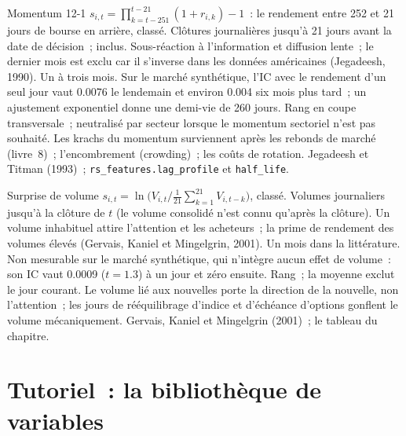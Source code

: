 \begin{predictorcard}{Momentum 12-1}\label{pred:rs:price-and-volume-features:momentum}
 $s_{i,t} = \prod_{k=t-251}^{t-21}(1 + r_{i,k}) - 1$~: le rendement entre 252 et 21 jours de bourse en arrière, classé.
 Clôtures journalières jusqu'à 21 jours avant la date de décision~;  inclus.
 Sous-réaction à l'information et diffusion lente~; le dernier mois est exclu car il s'inverse dans les données américaines
(Jegadeesh, 1990).
 Un à trois mois. Sur le marché synthétique, l'IC avec le rendement d'un seul jour vaut 0.0076 le lendemain et
environ 0.004 six mois plus tard~; un ajustement exponentiel donne une demi-vie de 260 jours.
 Rang en coupe transversale~; neutralisé par secteur lorsque le momentum sectoriel n'est pas souhaité.
 Les krachs du momentum surviennent après les rebonds de marché (livre~8)~; l'encombrement (crowding)~; les coûts de rotation.
 Jegadeesh et Titman (1993)~; \texttt{rs\_features.lag\_profile} et \texttt{half\_life}.
\end{predictorcard}

\begin{predictorcard}{Surprise de volume}\label{pred:rs:price-and-volume-features:volume}
 $s_{i,t} = \ln\bigl(V_{i,t}/\tfrac1{21}\sum_{k=1}^{21}V_{i,t-k}\bigr)$, classé.
 Volumes journaliers jusqu'à la clôture de $t$ (le volume consolidé n'est connu qu'après la clôture).
 Un volume inhabituel attire l'attention et les acheteurs~; la prime de rendement des volumes élevés (Gervais, Kaniel et Mingelgrin, 2001).
 Un mois dans la littérature. Non mesurable sur le marché synthétique, qui n'intègre aucun effet de volume~: son IC
vaut 0.0009 ($t = 1.3$) à un jour et zéro ensuite.
 Rang~; la moyenne exclut le jour courant.
 Le volume lié aux nouvelles porte la direction de la nouvelle, non l'attention~; les jours de rééquilibrage d'indice et d'échéance d'options gonflent le volume
mécaniquement.
 Gervais, Kaniel et Mingelgrin (2001)~; le tableau du chapitre.
\end{predictorcard}

\section{Tutoriel~: la bibliothèque de variables}\label{tut:rs:price-and-volume-features:library}

